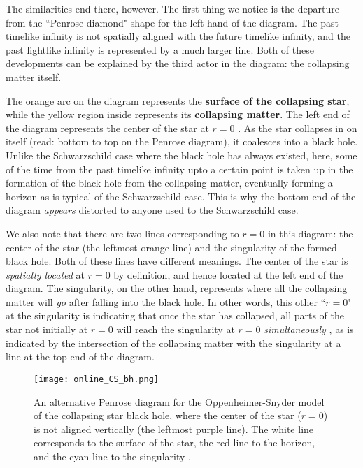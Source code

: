 \documentclass{article}
\begin{document}
The similarities end there, however. The first thing we notice is the departure from the ``Penrose diamond" shape for the left hand of the diagram. The past timelike infinity is not spatially aligned with the future timelike infinity, and the past lightlike infinity is represented by a much larger line. Both of these developments can be explained by the third actor in the diagram: the collapsing matter itself.

The orange arc on the diagram represents the \textbf{surface of the collapsing star}, while the yellow region inside represents its \textbf{collapsing matter}. The left end of the diagram represents the center of the star at  $r=0$ \cite{cs_diagram_original}. As the star collapses in on itself (read: bottom to top on the Penrose diagram), it coalesces into a black hole. Unlike the Schwarzschild case where the black hole has always existed, here, some of the time from the past timelike infinity upto a certain point is taken up in the formation of the black hole from the collapsing matter, eventually forming a horizon as is typical of the Schwarzschild case. This is why the bottom end of the diagram \textit{appears} distorted to anyone used to the Schwarzschild case.

We also note that there are two lines corresponding to $r=0$ in this diagram: the center of the star (the leftmost orange line) and the singularity of the formed black hole. Both of these lines have different meanings. The center of the star is \textit{spatially located} at $r=0$ by definition, and hence located at the left end of the diagram. The singularity, on the other hand, represents where all the collapsing matter will \textit{go} after falling into the black hole. In other words, this other ``$r=0$" at the singularity is indicating that once the star has collapsed, all parts of the star not initially at $r=0$ will reach the singularity at $r=0$ \textit{simultaneously} \cite{townsend1997black}, as is indicated by the intersection of the collapsing matter with the singularity at a line at the top end of the diagram.

\begin{wrapfigure}{l}{0.5\textwidth}
\texttt{[image: online\_CS\_bh.png]} 
\caption{An alternative Penrose diagram for the Oppenheimer-Snyder model of the collapsing star black hole, where the center of the star ($r=0$) is not aligned vertically (the leftmost purple line). The white line corresponds to the surface of the star, the red line to the horizon, and the cyan line to the singularity \cite{collapse_colorado}.}
\label{fig:penrose_collapsing_star_colorado}

\end{wrapfigure}
\end{document}
